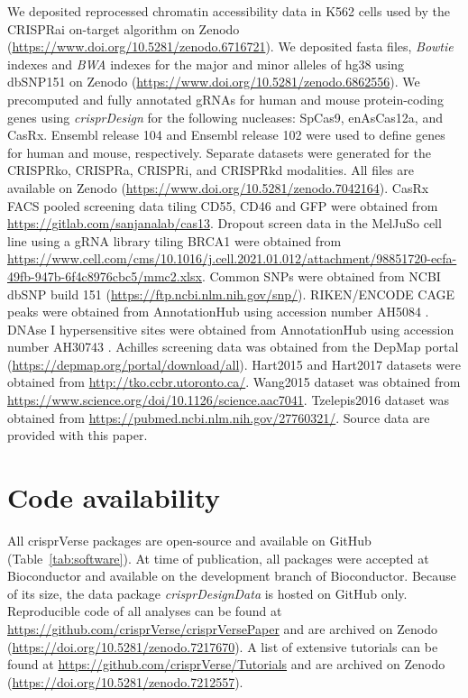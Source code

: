 \documentclass[pdftex,english,10pt]{article}
\begin{document}
{We deposited reprocessed chromatin accessibility data in K562 cells \citep{crispria} used by the CRISPRai on-target algorithm on Zenodo (\url{https://www.doi.org/10.5281/zenodo.6716721}).
We deposited fasta files, \textit{Bowtie} indexes and \textit{BWA} indexes for the major and minor alleles of hg38 using dbSNP151 on Zenodo (\url{https://www.doi.org/10.5281/zenodo.6862556}). We precomputed and fully annotated gRNAs for human and mouse protein-coding genes using \textit{crisprDesign} for the following nucleases: SpCas9, enAsCas12a, and CasRx. Ensembl release 104 and Ensembl release 102 were used to define genes for human and mouse, respectively. Separate datasets were generated for the CRISPRko, CRISPRa, CRISPRi, and CRISPRkd modalities. All files are available on Zenodo (\url{https://www.doi.org/10.5281/zenodo.7042164}).  
CasRx FACS pooled screening data tiling CD55, CD46 and GFP \citep{wessels2020massively} were obtained from \url{https://gitlab.com/sanjanalab/cas13}. 
Dropout screen data in the MelJuSo cell line using a gRNA library tiling BRCA1 \citep{hanna2021massively} were obtained from \url{https://www.cell.com/cms/10.1016/j.cell.2021.01.012/attachment/98851720-ecfa-49fb-947b-6f4c8976cbc5/mmc2.xlsx}. 
Common SNPs were obtained from NCBI dbSNP build 151 (\url{https://ftp.ncbi.nlm.nih.gov/snp/}).
RIKEN/ENCODE CAGE peaks were obtained from AnnotationHub using accession number AH5084 \citep{djebali2012landscape}.
DNAse I hypersensitive sites were obtained from AnnotationHub using accession number AH30743 \citep{kundaje2015integrative}.
Achilles screening data \citep{ceres} was obtained from the DepMap portal (\url{https://depmap.org/portal/download/all}).
Hart2015 \citep{toronto1} and Hart2017 \citep{toronto3} datasets were obtained from \url{http://tko.ccbr.utoronto.ca/}.
Wang2015 dataset \citep{sabatini} was obtained from \url{https://www.science.org/doi/10.1126/science.aac7041}.
Tzelepis2016 dataset \citep{yusa} was obtained from \url{https://pubmed.ncbi.nlm.nih.gov/27760321/}. 
Source data are provided with this paper.








\section*{Code availability}

All crisprVerse packages are open-source and available on GitHub (Table~\ref{tab:software}).
At time of publication, all packages were accepted at Bioconductor and available on the development branch of Bioconductor.
Because of its size, the data package \textit{crisprDesignData} is hosted on GitHub only. 
Reproducible code of all analyses can be found at \url{https://github.com/crisprVerse/crisprVersePaper} and are archived on Zenodo (\url{https://doi.org/10.5281/zenodo.7217670}).
A list of extensive tutorials can be found at \url{https://github.com/crisprVerse/Tutorials} and are archived on Zenodo (\url{https://doi.org/10.5281/zenodo.7212557}).

}
\end{document}
